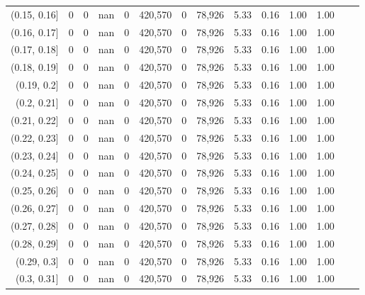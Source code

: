 \begin{tabular}{rrrrrrrrrrrrrr}
(0.15, 0.16]   &       0 &       0 &    nan &        0 &  420,570 &       0 &  78,926 &  5.33 &  0.16 &  1.00 &      1.00 \\
(0.16, 0.17]   &       0 &       0 &    nan &        0 &  420,570 &       0 &  78,926 &  5.33 &  0.16 &  1.00 &      1.00 \\
(0.17, 0.18]   &       0 &       0 &    nan &        0 &  420,570 &       0 &  78,926 &  5.33 &  0.16 &  1.00 &      1.00 \\
(0.18, 0.19]   &       0 &       0 &    nan &        0 &  420,570 &       0 &  78,926 &  5.33 &  0.16 &  1.00 &      1.00 \\
(0.19, 0.2]    &       0 &       0 &    nan &        0 &  420,570 &       0 &  78,926 &  5.33 &  0.16 &  1.00 &      1.00 \\
(0.2, 0.21]    &       0 &       0 &    nan &        0 &  420,570 &       0 &  78,926 &  5.33 &  0.16 &  1.00 &      1.00 \\
(0.21, 0.22]   &       0 &       0 &    nan &        0 &  420,570 &       0 &  78,926 &  5.33 &  0.16 &  1.00 &      1.00 \\
(0.22, 0.23]   &       0 &       0 &    nan &        0 &  420,570 &       0 &  78,926 &  5.33 &  0.16 &  1.00 &      1.00 \\
(0.23, 0.24]   &       0 &       0 &    nan &        0 &  420,570 &       0 &  78,926 &  5.33 &  0.16 &  1.00 &      1.00 \\
(0.24, 0.25]   &       0 &       0 &    nan &        0 &  420,570 &       0 &  78,926 &  5.33 &  0.16 &  1.00 &      1.00 \\
(0.25, 0.26]   &       0 &       0 &    nan &        0 &  420,570 &       0 &  78,926 &  5.33 &  0.16 &  1.00 &      1.00 \\
(0.26, 0.27]   &       0 &       0 &    nan &        0 &  420,570 &       0 &  78,926 &  5.33 &  0.16 &  1.00 &      1.00 \\
(0.27, 0.28]   &       0 &       0 &    nan &        0 &  420,570 &       0 &  78,926 &  5.33 &  0.16 &  1.00 &      1.00 \\
(0.28, 0.29]   &       0 &       0 &    nan &        0 &  420,570 &       0 &  78,926 &  5.33 &  0.16 &  1.00 &      1.00 \\
(0.29, 0.3]    &       0 &       0 &    nan &        0 &  420,570 &       0 &  78,926 &  5.33 &  0.16 &  1.00 &      1.00 \\
(0.3, 0.31]    &       0 &       0 &    nan &        0 &  420,570 &       0 &  78,926 &  5.33 &  0.16 &  1.00 &      1.00 \\

\end{tabular}
